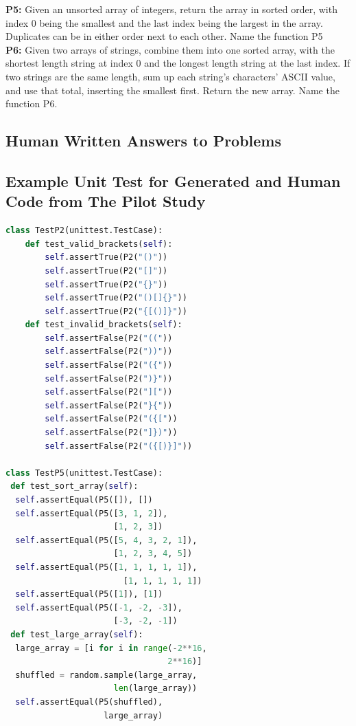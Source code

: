 \documentclass[manuscript,screen,review,sigconf]{acmart}
\begin{document}
\textbf{P5:} Given an unsorted array of integers, return the array in sorted order, with index 0 being the smallest and the last index being the largest in the array. Duplicates can be in either order next to each other. Name the function P5\\

\textbf{P6:} Given two arrays of strings, combine them into one sorted array, with the shortest length string at index 0 and the longest length string at the last index. If two strings are the same length, sum up each string’s characters’ ASCII value, and use that total, inserting the smallest first. Return the new array. Name the function P6.\\

\subsection{Human Written Answers to Problems}

\subsection{Example Unit Test for Generated and Human Code from The Pilot Study}
\begin{lstlisting}[language=Python]
class TestP2(unittest.TestCase):
    def test_valid_brackets(self):
        self.assertTrue(P2("()"))
        self.assertTrue(P2("[]"))
        self.assertTrue(P2("{}"))
        self.assertTrue(P2("()[]{}"))
        self.assertTrue(P2("{[()]}"))
    def test_invalid_brackets(self):
        self.assertFalse(P2("(("))
        self.assertFalse(P2("))"))
        self.assertFalse(P2("({"))
        self.assertFalse(P2(")}"))
        self.assertFalse(P2("]["))
        self.assertFalse(P2("}{"))
        self.assertFalse(P2("({["))
        self.assertFalse(P2("]})"))
        self.assertFalse(P2("({[)}]"))

class TestP5(unittest.TestCase):
 def test_sort_array(self):
  self.assertEqual(P5([]), [])
  self.assertEqual(P5([3, 1, 2]),
                      [1, 2, 3])
  self.assertEqual(P5([5, 4, 3, 2, 1]),
                      [1, 2, 3, 4, 5])
  self.assertEqual(P5([1, 1, 1, 1, 1]),
                        [1, 1, 1, 1, 1])
  self.assertEqual(P5([1]), [1])
  self.assertEqual(P5([-1, -2, -3]),
                      [-3, -2, -1])
 def test_large_array(self):
  large_array = [i for i in range(-2**16,
                                 2**16)]
  shuffled = random.sample(large_array,
                      len(large_array))
  self.assertEqual(P5(shuffled),
                    large_array)
\end{lstlisting}
\end{document}
